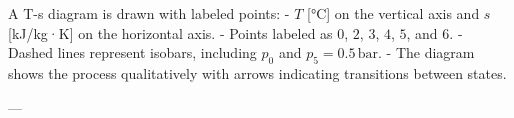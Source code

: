 A T-s diagram is drawn with labeled points:  
- \( T \) [°C] on the vertical axis and \( s \) [kJ/kg·K] on the horizontal axis.  
- Points labeled as \( 0 \), \( 2 \), \( 3 \), \( 4 \), \( 5 \), and \( 6 \).  
- Dashed lines represent isobars, including \( p_0 \) and \( p_5 = 0.5 \, \text{bar} \).  
- The diagram shows the process qualitatively with arrows indicating transitions between states.  

---